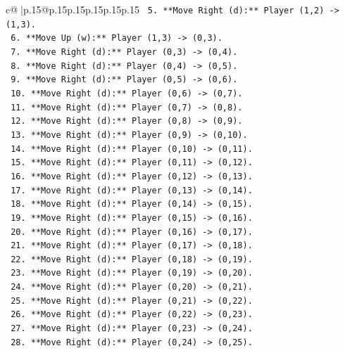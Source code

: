 \documentclass{article}
\begin{document}
{\begin{supertabular}{c@{$\;$}|p{.15\linewidth}@{}p{.15\linewidth}p{.15\linewidth}p{.15\linewidth}p{.15\linewidth}p{.15\linewidth}}
{{{\texttt{        5.  **Move Right (d):** Player (1,2) {-}> (1,3).} \\
\texttt{        6.  **Move Up (w):** Player (1,3) {-}> (0,3).} \\
\texttt{        7.  **Move Right (d):** Player (0,3) {-}> (0,4).} \\
\texttt{        8.  **Move Right (d):** Player (0,4) {-}> (0,5).} \\
\texttt{        9.  **Move Right (d):** Player (0,5) {-}> (0,6).} \\
\texttt{        10. **Move Right (d):** Player (0,6) {-}> (0,7).} \\
\texttt{        11. **Move Right (d):** Player (0,7) {-}> (0,8).} \\
\texttt{        12. **Move Right (d):** Player (0,8) {-}> (0,9).} \\
\texttt{        13. **Move Right (d):** Player (0,9) {-}> (0,10).} \\
\texttt{        14. **Move Right (d):** Player (0,10) {-}> (0,11).} \\
\texttt{        15. **Move Right (d):** Player (0,11) {-}> (0,12).} \\
\texttt{        16. **Move Right (d):** Player (0,12) {-}> (0,13).} \\
\texttt{        17. **Move Right (d):** Player (0,13) {-}> (0,14).} \\
\texttt{        18. **Move Right (d):** Player (0,14) {-}> (0,15).} \\
\texttt{        19. **Move Right (d):** Player (0,15) {-}> (0,16).} \\
\texttt{        20. **Move Right (d):** Player (0,16) {-}> (0,17).} \\
\texttt{        21. **Move Right (d):** Player (0,17) {-}> (0,18).} \\
\texttt{        22. **Move Right (d):** Player (0,18) {-}> (0,19).} \\
\texttt{        23. **Move Right (d):** Player (0,19) {-}> (0,20).} \\
\texttt{        24. **Move Right (d):** Player (0,20) {-}> (0,21).} \\
\texttt{        25. **Move Right (d):** Player (0,21) {-}> (0,22).} \\
\texttt{        26. **Move Right (d):** Player (0,22) {-}> (0,23).} \\
\texttt{        27. **Move Right (d):** Player (0,23) {-}> (0,24).} \\
\texttt{        28. **Move Right (d):** Player (0,24) {-}> (0,25).} \\
}}}
\end{supertabular}}
\end{document}
